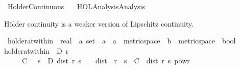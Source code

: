 %
\begin{isabellebody}%
%
%
\isadelimtheory
%
\endisadelimtheory
%
\isatagtheory
{}\isamarkupfalse%
\ Holder{\isacharunderscore}{\kern0pt}Continuous\isanewline
\ \ \ {\isachardoublequoteopen}HOL{\isacharminus}{\kern0pt}Analysis{\isachardot}{\kern0pt}Analysis{\isachardoublequoteclose}\isanewline
{}%
\endisatagtheory
{\isafoldtheory}%
%
\isadelimtheory
%
\endisadelimtheory
%
\begin{isamarkuptext}%
H{\"o}lder continuity is a weaker version of Lipschitz continuity.%
\end{isamarkuptext}\isamarkuptrue%
\isamarkupfalse%
\ holder{\isacharunderscore}{\kern0pt}at{\isacharunderscore}{\kern0pt}within\ {\isacharcolon}{\kern0pt}{\isacharcolon}{\kern0pt}\ {\isachardoublequoteopen}real\ {\isasymRightarrow}\ {\isacharprime}{\kern0pt}a\ set\ {\isasymRightarrow}\ {\isacharprime}{\kern0pt}a\ {\isasymRightarrow}\ {\isacharparenleft}{\kern0pt}{\isacharprime}{\kern0pt}a\ {\isacharcolon}{\kern0pt}{\isacharcolon}{\kern0pt}\ metric{\isacharunderscore}{\kern0pt}space\ {\isasymRightarrow}\ {\isacharprime}{\kern0pt}b\ {\isacharcolon}{\kern0pt}{\isacharcolon}{\kern0pt}\ metric{\isacharunderscore}{\kern0pt}space{\isacharparenright}{\kern0pt}\ {\isasymRightarrow}\ bool{\isachardoublequoteclose}\ \isanewline
{\isachardoublequoteopen}holder{\isacharunderscore}{\kern0pt}at{\isacharunderscore}{\kern0pt}within\ {\isasymgamma}\ D\ r\ {\isasymphi}\ {\isasymequiv}\ {\isasymgamma}\ {\isasymin}\ {\isacharbraceleft}{\kern0pt}{}{\isacharless}{\kern0pt}{\isachardot}{\kern0pt}{\isachardot}{\kern0pt}{}{\isacharbraceright}{\kern0pt}\ {\isasymand}\ \isanewline
\ \ {\isacharparenleft}{\kern0pt}{\isasymexists}{\isasymepsilon}\ {\isachargreater}{\kern0pt}\ {}{\isachardot}{\kern0pt}\ {\isasymexists}C\ {\isasymge}\ {}{\isachardot}{\kern0pt}\ {\isasymforall}s\ {\isasymin}\ D{\isachardot}{\kern0pt}\ dist\ r\ s\ {\isacharless}{\kern0pt}\ {\isasymepsilon}\ {\isasymlongrightarrow}\ dist\ {\isacharparenleft}{\kern0pt}{\isasymphi}\ r{\isacharparenright}{\kern0pt}\ {\isacharparenleft}{\kern0pt}{\isasymphi}\ s{\isacharparenright}{\kern0pt}\ {\isasymle}\ C\ {\isacharasterisk}{\kern0pt}\ dist\ r\ s\ powr\ {\isasymgamma}{\isacharparenright}{\kern0pt}{\isachardoublequoteclose}%
\end{isabellebody}
